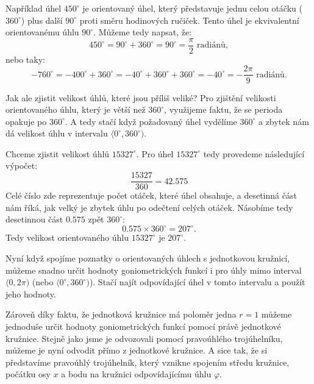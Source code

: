 \documentclass[12pt,a4paper]{article}
\begin{document}
\begin{examplebox}
    Například úhel $450^\circ$ je orientovaný úhel, který představuje jednu celou otáčku ($360^\circ$) plus další $90^\circ$ proti směru hodinových ručiček.
    Tento úhel je ekvivalentní orientovanému úhlu $90^\circ$.
    Můžeme tedy napsat, že:
    \[
    450^\circ = 90^\circ + 360^\circ = 90^\circ = \frac{\pi}{2} \text{ radiánů},
    \]
    nebo taky:
    \[
    -760^\circ = -400^\circ + 360^\circ = -40^\circ + 360^\circ + 360^\circ = -40^\circ = -\frac{2\pi}{9} \text{ radiánů}.
    \]
\end{examplebox}

Jak ale zjistit velikost úhlů, které jsou příliš veliké? 
Pro zjištění velikosti orientovaného úhlu, který je větší než $360^\circ$, využijeme faktu, že se perioda opakuje po $360^\circ$.
A tedy stačí když požadovaný úhel vydělíme $360^\circ$ a zbytek nám dá velikost úhlu v intervalu $\langle 0^\circ, 360^\circ)$.

\begin{examplebox}
    Chceme zjistit velikost úhlů $15327^\circ$.
    Pro úhel $15327^\circ$ tedy provedeme následující výpočet:
    \[
    \frac{15327}{360} = 42.575
    \]
    Celé číslo zde reprezentuje počet otáček, které úhel obsahuje, a desetinná část nám říká, jak velký je zbytek úhlu po odečtení celých otáček.
    Násobíme tedy desetinnou část $0.575$ zpět $360^\circ$:
    \[0.575 \times 360^\circ = 207^\circ.\]
    Tedy velikost orientovaného úhlu $15327^\circ$ je $207^\circ$.
\end{examplebox}

Nyní když spojíme poznatky o orientovaných úhlech s jednotkovou kružnicí, můžeme snadno určit hodnoty goniometrických funkcí
i pro úhly mimo interval $\langle 0, 2\pi)$ (nebo $\langle 0^\circ, 360^\circ)$). Stačí najít odpovídající úhel v tomto intervalu a použít jeho hodnoty.    

Zároveň díky faktu, že jednotková kružnice má poloměr jedna $r=1$ můžeme jednoduše určit hodnoty goniometrických funkcí pomocí právě jednotkové kružnice.
Stejně jako jsme je odvozovali pomocí pravoúhlého trojúhelníku, můžeme je nyní odvodit přímo z jednotkové kružnice.
A sice tak, že si představíme pravoúhlý trojúhelník, který vznikne spojením středu kružnice,
počátku osy $x$ a bodu na kružnici odpovídajícímu úhlu $\varphi$.
\end{document}
